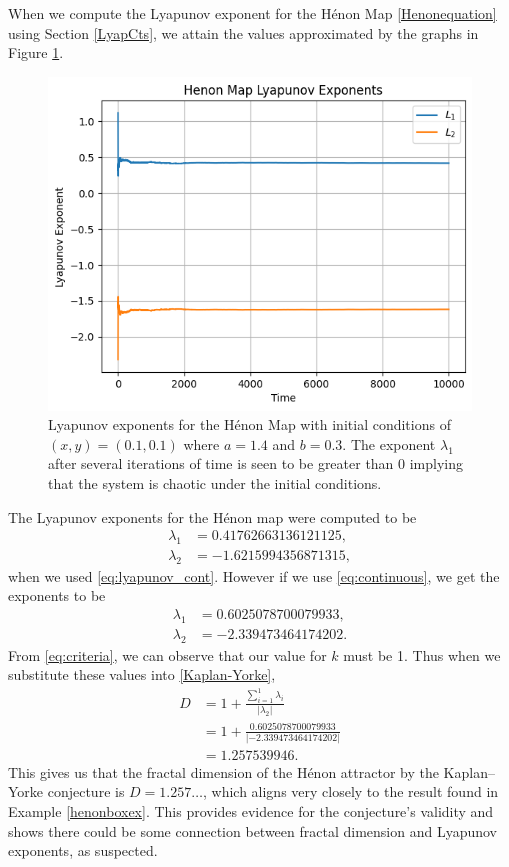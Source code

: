 \begin{exmp}
    When we compute the Lyapunov exponent for the Hénon Map \eqref{Henonequation} using Section \ref{LyapCts}, we attain the values approximated by the graphs in Figure \ref{fig:LyaHen}.
    \begin{figure}
        \centering
        \includegraphics[width=0.8\linewidth]{Bifurcation Images/lyapunov_henon.png}
        \caption{Lyapunov exponents for the Hénon Map with initial conditions of $(x,y)=(0.1,0.1)$ where $a=1.4$ and $b=0.3$. The exponent $\lambda_1$ after several iterations of time is seen to be greater than 0 implying that the system is chaotic under the initial conditions.}
        \label{fig:LyaHen}
    \end{figure}
    The Lyapunov exponents for the Hénon map were computed to be 
    \begin{align*}
        \lambda_1 &= 0.41762663136121125, \\
        \lambda_2 &= -1.6215994356871315,
    \end{align*}
     when we used \eqref{eq:lyapunov_cont}. However if we use \eqref{eq:continuous}, we get the exponents to be 
    \begin{align*}
        \lambda_1 &= 0.6025078700079933, \\
        \lambda_2 &= -2.339473464174202.
    \end{align*}
    From \eqref{eq:criteria}, we can observe that our value for $k$ must be 1. Thus when we substitute these values into \eqref{Kaplan-Yorke},
    \begin{align}
        D &= 1 + \frac{\sum_{i=1}^1 \lambda_i}{|\lambda_{2}|} \\
        &=1 + \frac{0.6025078700079933}{|-2.339473464174202|} \\
        &=1.257539946.
    \end{align}
    This gives us that the fractal dimension of the Hénon attractor by the Kaplan–Yorke conjecture is $D=1.257\dots$, which aligns very closely to the result found in Example \ref{henonboxex}. This provides evidence for the conjecture's validity and shows there could be some connection between fractal dimension and Lyapunov exponents, as suspected.


\end{exmp}
